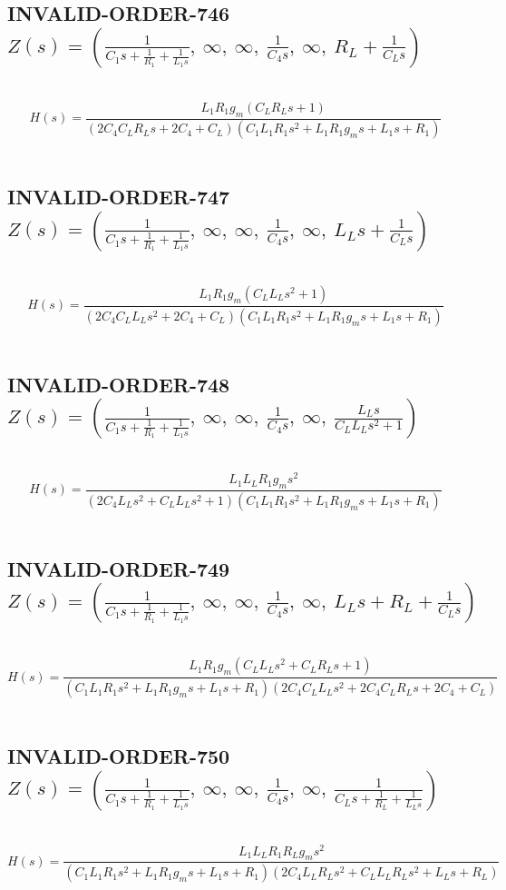 \documentclass{article}
\begin{document}
\subsection{INVALID-ORDER-746 $Z(s) = \left( \frac{1}{C_{1} s + \frac{1}{R_{1}} + \frac{1}{L_{1} s}}, \  \infty, \  \infty, \  \frac{1}{C_{4} s}, \  \infty, \  R_{L} + \frac{1}{C_{L} s}\right)$ } \ 
\textbf{\[H(s) = \frac{L_{1} R_{1} g_{m} \left(C_{L} R_{L} s + 1\right)}{\left(2 C_{4} C_{L} R_{L} s + 2 C_{4} + C_{L}\right) \left(C_{1} L_{1} R_{1} s^{2} + L_{1} R_{1} g_{m} s + L_{1} s + R_{1}\right)}\] } \ 
\subsection{INVALID-ORDER-747 $Z(s) = \left( \frac{1}{C_{1} s + \frac{1}{R_{1}} + \frac{1}{L_{1} s}}, \  \infty, \  \infty, \  \frac{1}{C_{4} s}, \  \infty, \  L_{L} s + \frac{1}{C_{L} s}\right)$ } \ 
\textbf{\[H(s) = \frac{L_{1} R_{1} g_{m} \left(C_{L} L_{L} s^{2} + 1\right)}{\left(2 C_{4} C_{L} L_{L} s^{2} + 2 C_{4} + C_{L}\right) \left(C_{1} L_{1} R_{1} s^{2} + L_{1} R_{1} g_{m} s + L_{1} s + R_{1}\right)}\] } \ 
\subsection{INVALID-ORDER-748 $Z(s) = \left( \frac{1}{C_{1} s + \frac{1}{R_{1}} + \frac{1}{L_{1} s}}, \  \infty, \  \infty, \  \frac{1}{C_{4} s}, \  \infty, \  \frac{L_{L} s}{C_{L} L_{L} s^{2} + 1}\right)$ } \ 
\textbf{\[H(s) = \frac{L_{1} L_{L} R_{1} g_{m} s^{2}}{\left(2 C_{4} L_{L} s^{2} + C_{L} L_{L} s^{2} + 1\right) \left(C_{1} L_{1} R_{1} s^{2} + L_{1} R_{1} g_{m} s + L_{1} s + R_{1}\right)}\] } \ 
\subsection{INVALID-ORDER-749 $Z(s) = \left( \frac{1}{C_{1} s + \frac{1}{R_{1}} + \frac{1}{L_{1} s}}, \  \infty, \  \infty, \  \frac{1}{C_{4} s}, \  \infty, \  L_{L} s + R_{L} + \frac{1}{C_{L} s}\right)$ } \ 
\textbf{\[H(s) = \frac{L_{1} R_{1} g_{m} \left(C_{L} L_{L} s^{2} + C_{L} R_{L} s + 1\right)}{\left(C_{1} L_{1} R_{1} s^{2} + L_{1} R_{1} g_{m} s + L_{1} s + R_{1}\right) \left(2 C_{4} C_{L} L_{L} s^{2} + 2 C_{4} C_{L} R_{L} s + 2 C_{4} + C_{L}\right)}\] } \ 
\subsection{INVALID-ORDER-750 $Z(s) = \left( \frac{1}{C_{1} s + \frac{1}{R_{1}} + \frac{1}{L_{1} s}}, \  \infty, \  \infty, \  \frac{1}{C_{4} s}, \  \infty, \  \frac{1}{C_{L} s + \frac{1}{R_{L}} + \frac{1}{L_{L} s}}\right)$ } \ 
\textbf{\[H(s) = \frac{L_{1} L_{L} R_{1} R_{L} g_{m} s^{2}}{\left(C_{1} L_{1} R_{1} s^{2} + L_{1} R_{1} g_{m} s + L_{1} s + R_{1}\right) \left(2 C_{4} L_{L} R_{L} s^{2} + C_{L} L_{L} R_{L} s^{2} + L_{L} s + R_{L}\right)}\] } \ 
\end{document}
